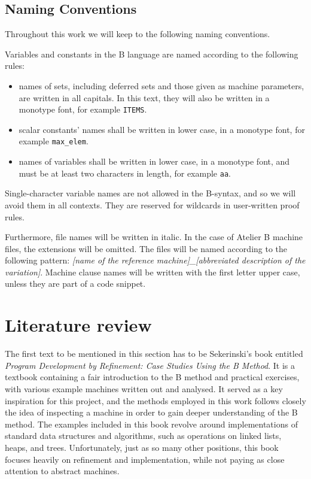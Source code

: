 \documentclass[11pt,journal]{IEEEtran}
\begin{document}
	\subsection{Naming Conventions}
	Throughout this work we will keep to the following naming conventions.
	
	Variables and constants in the B language are named according to the following rules:
	\begin{itemize}
		\item names of sets, including deferred sets and those given as machine parameters, are written in all capitals. In this text, they will also be written in a monotype font, for example \texttt{ITEMS}.
		\item scalar constants' names shall be written in lower case, in a monotype font, for example \texttt{max\_elem}.
		\item names of variables shall be written in lower case, in a monotype font, and must be at least two characters in length, for example \texttt{aa}.
	\end{itemize}
	Single-character variable names are not allowed in the B-syntax, and so we will avoid them in all contexts. They are reserved for wildcards in user-written proof rules.
	
	Furthermore, file names will be written in italic. In the case of Atelier B machine files, the extensions will be omitted. The files will be named according to the following pattern: \emph{[name of the reference machine]\_[abbreviated description of the variation]}. Machine clause names will be written with the first letter upper case, unless they are part of a code snippet.
	
	\section{Literature review}
	The first text to be mentioned in this section has to be Sekerinski's book entitled \emph{Program Development by Refinement: Case Studies Using the B Method}\cite{Sekerinski}. It is a textbook containing a fair introduction to the B method and practical exercises, with various example machines written out and analysed. It served as a key inspiration for this project, and the methods employed in this work follows closely the idea of inspecting a machine in order to gain deeper understanding of the B method. The examples included in this book revolve around implementations of standard data structures and algorithms, such as operations on linked lists, heaps, and trees. Unfortunately, just as so many other positions, this book focuses heavily on refinement and implementation, while not paying as close attention to abstract machines.
	
\end{document}
